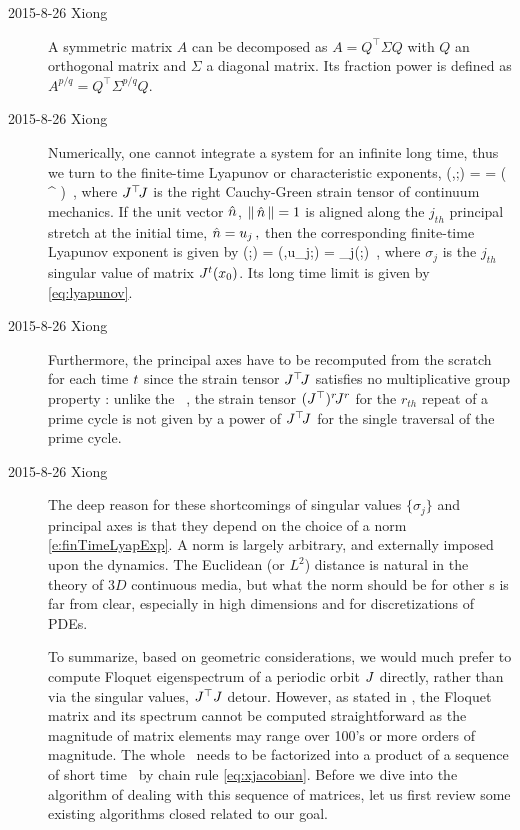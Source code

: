 \begin{description}
\item[2015-8-26 Xiong]
  A symmetric matrix $A$ can be decomposed as $A = Q^\top \Sigma Q$
  with $Q$ an orthogonal matrix
  and $\Sigma$ a diagonal matrix. Its fraction power is defined as
  $A^{p/q} = Q^\top \Sigma^{p/q} Q$.

\item[2015-8-26 Xiong]
  Numerically, one cannot integrate a system for an infinite long time,
  thus we turn to the {finite-time} {Lyapunov} or {characteristic} exponents,
  \beq
  \eigExp(\xInit,\unitVec;\zeit)
  =  \ln \norm{{\jMps}^\zeit \unitVec}
  = \ln\left(
    \transp{\unitVec} \transp{\jMps^\zeit}\!\jMps^\zeit {\unitVec}
  \right)
  \,,
  where ${J}{}^\top\!J$ is the right Cauchy-Green strain tensor of
  continuum mechanics. If the unit vector $\hat{n}$, $\left\Arrowvert \, \hat{n} \, \right\Arrowvert =1$
  is aligned along the $j_{th}$ {principal stretch} at the initial time,
  \(
  \hat{n} = {u}_{j}
  \,,
  \)
  then the corresponding finite-time Lyapunov exponent is given by
  \beq
  \eigExp[j](\xInit;\zeit) =
  \eigExp(\xInit,{u}_{j};\zeit)
  = \ln\sigma_j(\xInit;\zeit)
  \,,
  where $\sigma_j$ is the $j_{th}$ singular value of
  matrix $J^{t}({x_0})$. Its long time limit is given by
  \eqref{eq:lyapunov}.

\item[2015-8-26 Xiong]
  Furthermore, the principal axes have to be recomputed from the scratch
  for each time $t$ since the strain tensor ${J}{}^\top\!J$
  satisfies no multiplicative group property : unlike
  the \po\ \jacobianM, the strain tensor $({J}{}^\top{})^r\!J^r$
  for the $r_{th}$ repeat of a prime cycle is not given by a power of
  ${J}{}^\top\!J$ for the single traversal of the prime cycle.

\item[2015-8-26 Xiong]
  The deep reason for these shortcomings of singular values
  $\{\sigma_{j}\}$ and principal axes is that they depend on the choice of
  a norm \eqref{e:finTimeLyapExp}. A norm is largely arbitrary, and externally
  imposed upon the dynamics. The Euclidean (or $L^2$) distance is
  natural in the theory of $3D$ continuous media, but what the norm should
  be for other \statesp s is far from clear, especially in high dimensions
  and for discretizations of PDEs.

  To summarize, based on geometric considerations, we would much prefer to
  compute Floquet eigenspectrum of a periodic orbit $J$ directly,
  rather than via the singular values, $J^\top J$ detour.
  However, as stated in ,
  the Floquet matrix and its spectrum cannot be computed straightforward
  as the magnitude of matrix elements may range over 100's or
  more orders of magnitude. The whole \JacobianM\ needs to be factorized into
  a product of a sequence of short time \JacobianMs\ by chain rule
  \eqref{eq:xjacobian}.
  Before we dive into the algorithm of dealing with this sequence of matrices,
  let us first review some existing algorithms closed related to our goal.


\end{description}
